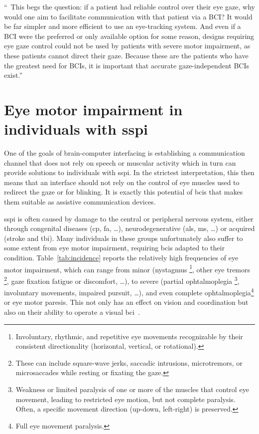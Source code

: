 \epigraph{%
  ``\elide\ This begs the question: if a patient had reliable control
  over their eye gaze, why would one aim to facilitate communication with that
  patient via a BCI? It would be far simpler and more efficient to use an
  eye-tracking system.
  And even if a BCI were the preferred or only available option for some reason,
  designs requiring eye gaze control could not be used
  by patients with severe motor impairment, as these patients
  cannot direct their gaze.
  Because these are the patients who have the greatest need for BCIs, it is
  important that accurate gaze-independent BCIs exist.''
}{%
  \textcite{Egan2017}
}


\section{Eye motor impairment in individuals with \acl{sspi}}%
\label{sec:gaze-dependence}

One of the goals of brain-computer interfacing is establishing a communication
channel that does not rely on speech or muscular activity which in turn can
provide solutions to individuals with \ac{sspi}.
In the strictest interpretation, this then means that an interface should not
rely on the control of eye muscles used to redirect the gaze or for blinking.
It is exactly this potential of \acp{bci} that makes them suitable as assistive
communication devices.

\Ac{sspi} is often caused by damage to the central or peripheral nervous
system, either through congenital diseases (\ac{cp}, \ac{fa}, \ldots),
neurodegenerative (\ac{als}, \ac{ms}, \ldots) or acquired (stroke and
\ac{tbi}).
Many individuals in these groups unfortunately also suffer to
some extent from eye motor impairment, requiring \ac{bci}s adapted to their condition.
Table~\ref{tab:incidence} reports the relatively high frequencies of
eye motor impairment, which can range from minor (nystagmus
\footnote{%
Involuntary, rhythmic, and repetitive eye movements recognizable by their
consistent directionality (horizontal, vertical, or rotational).
}, other eye tremors
\footnote{%
These can include square-wave jerks, saccadic intrusions, microtremors, or
microsaccades while resting or fixating the gaze.
}, gaze fixation fatigue or discomfort, \ldots), to severe (partial ophtalmoplegia
\footnote{%
Weakness or limited paralysis of one or more of the muscles that control eye
movement, leading to restricted eye motion, but not complete paralysis.
Often, a specific movement direction (up-down, left-right) is preserved.
}, involuntary movements, impaired pursuit, \ldots), and even complete
ophtalmoplegia\footnote{Full eye movement paralysis.} or eye motor paresis.
This not only has an effect on vision and coordination but also
on their ability to operate a visual \ac{bci}~\cite{FriedOken2020}.

